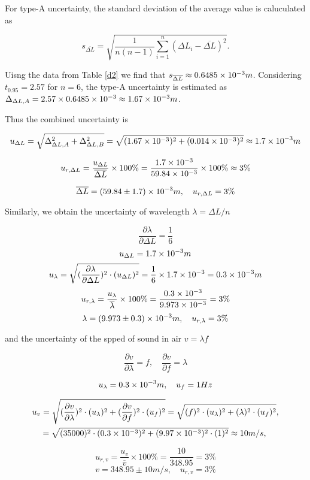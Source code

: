 For type-A uncertainty, the standard deviation of the average value is caluculated as

\[
    s_{\overline{\Delta L}}=\sqrt{\frac{1}{n(n-1)}\sum_{i=1}^n(\Delta
      L_i-\overline{\Delta L})^2}. 
\]

Uisng the data from Table \ref{d2} we find that $s_{\overline{\Delta
    L}}\approx 0.6485\times 10^{-3}m$. Considering $t_{0.95}=2.57$ for $n=6$, the
type-A uncertainty is estimated as $\Delta_{\Delta
  L,A}=2.57\times0.6485\times 10^{-3}\approx 1.67\times 10^{-3}m$. 

Thus the combined uncertainty is 


$$u_{\Delta L}=\sqrt{\Delta_{\Delta L,A}^2+\Delta_{\Delta
    L,B}^2}=\sqrt{(1.67\times 10^{-3})^2+(0.014\times 10^{-3})^2}\approx1.7\times 10^{-3}m$$

$$u_{r,\Delta L}=\frac{u_{\Delta L}}{\overline{\Delta L}}\times
100\%=\frac{1.7\times 10^{-3}}{59.84\times 10^{-3}}\times100\%\approx3\%$$

$$\overline{\Delta L}=(59.84\pm 1.7)\times 10^{-3}m,\quad u_{r,\Delta L}=3\% $$


Similarly, we obtain the uncertainty of wavelength $\lambda=\Delta L/n$


$$\frac{\partial \lambda}{\partial \Delta L}=\frac{1}{6}$$
$$u_{\Delta L}=1.7\times 10^{-3}m$$
$$u_{\lambda}=\sqrt{(\frac{\partial \lambda}{\partial \Delta L})^2\cdot
      (u_{\Delta L})^2}=\frac{1}{6}\times 1.7\times 10^{-3}=0.3\times 10^{-3}m$$
$$u_{r,\lambda}=\frac{u_{\lambda}}{\overline{\lambda}}\times
100\%=\frac{0.3\times 10^{-3}}{9.973\times 10^{-3}}=3\%$$
$$\lambda=(9.973\pm0.3)\times 10^{-3}m,\quad u_{r,\lambda}=3\%$$


and the uncertainty of the spped of sound in air $v=\lambda f$


$$\frac{\partial v}{\partial \lambda}=f,
\quad \frac{\partial v}{\partial f}=\lambda$$ 

$$u_{\lambda}=0.3\times 10^{-3}m,\quad u_{f}=1Hz$$

\[
\begin{split}
    &u_{v}=\sqrt{(\frac{\partial v}{\partial \lambda})^2\cdot
      (u_{\lambda})^2+(\frac{\partial v}{\partial f})^2\cdot
      (u_{f})^2}=\sqrt{(f)^2\cdot (u_{\lambda})^2+(\lambda)^2\cdot
      (u_{f})^2},\\ 
    &\quad =\sqrt{(35000)^2\cdot(0.3\times 10^{-3})^2+(9.97\times 10^{-3})^2\cdot(1)^2}
    \approx10m/s,\\
\end{split}
\]


$$u_{r,v}=\frac{u_v}{\overline{v}}\times 100\%=\frac{10}{348.95}=3\%$$
$$v=348.95\pm10 m/s,\quad u_{r,v}=3\%$$


